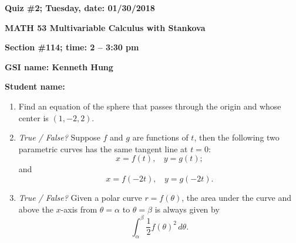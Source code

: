 \documentclass{article}
\begin{document}
{\bf Quiz \#2; Tuesday, date: 01/30/2018}

{\bf MATH 53 Multivariable Calculus with Stankova}

{\bf Section \#114; time: 2 -- 3:30 pm}

{\bf GSI name: Kenneth Hung}

{\bf Student name:}

\vspace*{0.25in}

\begin{enumerate}
\item Find an equation of the sphere that passes through the origin and whose center is $(1, -2, 2)$.

\item {\em True / False?} Suppose $f$ and $g$ are functions of $t$, then the following two parametric curves has the same tangent line at $t = 0$:
\[
x = f(t), ~~~~ y = g(t);
\]
and
\[
x = f(-2t), ~~~~ y = g(-2t).
\]

\item {\em True / False?} Given a polar curve $r = f(\theta)$, the area under the curve and above the $x$-axis from $\theta = \alpha$ to $\theta = \beta$ is always given by
\[
\int_\alpha^\beta \frac{1}{2} f(\theta)^2 \,d\theta.
\]
\end{enumerate}
\end{document}
